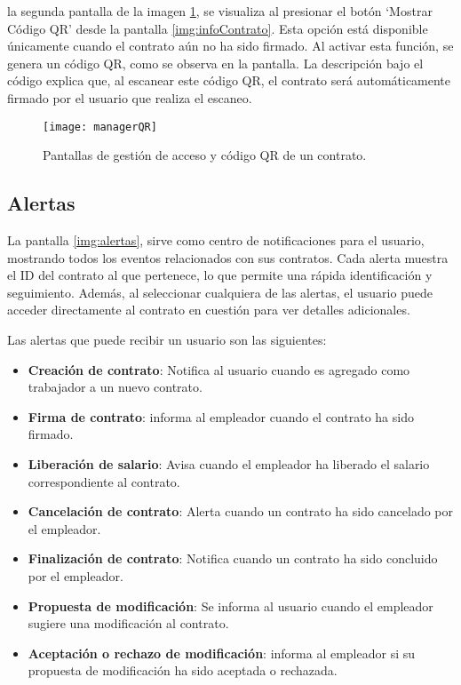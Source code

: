 la segunda pantalla de la imagen \ref{img:managerQR}, se visualiza al presionar el botón `Mostrar Código QR' desde la pantalla \ref{img:infoContrato}.
Esta opción está disponible únicamente cuando el contrato aún no ha sido firmado. Al activar esta función, se genera un código QR, como se observa en la pantalla. La descripción bajo el código explica que, al escanear este código QR, el contrato será automáticamente firmado por el usuario que realiza el escaneo.

\begin{figure}[h]
	\label{img:managerQR}
	\centering
	\texttt{[image: managerQR]}
	\caption[Pantalla añadir manager y código QR]{Pantallas de gestión de acceso y código QR de un contrato.}
\end{figure}


\subsection{Alertas}

La pantalla \ref{img:alertas}, sirve como centro de notificaciones para el usuario, mostrando todos los eventos relacionados con sus contratos.
Cada alerta muestra el ID del contrato al que pertenece, lo que permite una rápida identificación y seguimiento. Además, al seleccionar cualquiera de las alertas, el usuario puede acceder directamente al contrato en cuestión para ver detalles adicionales.

Las alertas que puede recibir un usuario son las siguientes:
\begin{itemize}
\item \textbf{Creación de contrato}: Notifica al usuario cuando es agregado como trabajador a un nuevo contrato.

\item \textbf{Firma de contrato}: informa al empleador cuando el contrato ha sido firmado.

\item \textbf{Liberación de salario}: Avisa cuando el empleador ha liberado el salario correspondiente al contrato.

\item \textbf{Cancelación de contrato}: Alerta cuando un contrato ha sido cancelado por el empleador.

\item \textbf{Finalización de contrato}: Notifica cuando un contrato ha sido concluido por el empleador.

\item \textbf{Propuesta de modificación}: Se informa al usuario cuando el empleador sugiere una modificación al contrato.

\item \textbf{Aceptación o rechazo de modificación}: informa al empleador si su propuesta de modificación ha sido aceptada o rechazada.
\end{itemize}

